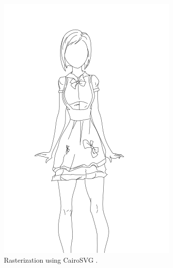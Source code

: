 \begin{figure}
    \centering
    \begin{subfigure}{.45\textwidth}
        \includegraphics[width=\textwidth]{graphics/sketchbench/raster/Art_freeform_AG_03_Branislav Mirkovic_norm_cleaned_cairosvg.png}
        \caption{Rasterization using CairoSVG \citep{cairosvg}.}
    \end{subfigure}
    \begin{subfigure}{.45\textwidth}

\end{subfigure}
\end{figure}
